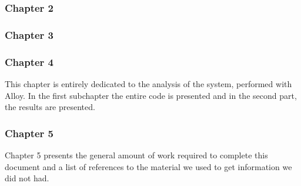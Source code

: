 \begin{flushleft}
\paragraph{}

{\color{Blue}\subsubsection{Chapter 2}}
{\color{Blue}\subsubsection{Chapter 3}}
{\color{Blue}\subsubsection{Chapter 4}}
This chapter is entirely dedicated to the analysis of the system, performed with Alloy. In the first subchapter the entire code is presented and in the second part, the results are presented. \par
\paragraph{}

{\color{Blue}\subsubsection{Chapter 5}}
Chapter 5 presents the general amount of work required to complete this document and a list of references to the material we used to get information we did not had.\par
\paragraph{}

\end{flushleft}